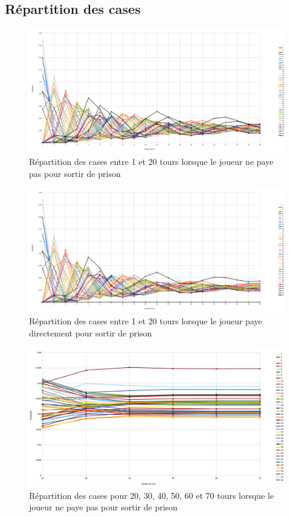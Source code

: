 \documentclass[letterpaper]{article}
\begin{document}
      \subsection{Répartition des cases}
	\begin{center}
	  \begin{figure}[bp!]
	    \includegraphics[scale=0.26]{./Images/GraphRepPayePasLeq20.png}
	    \caption{\label{graph_result_paye_pas} Répartition des cases entre 1 et 20 tours lorsque le joueur ne paye pas pour sortir de prison}
	  \end{figure}

	  \begin{figure}[bp!]
	    \includegraphics[scale=0.26]{./Images/GraphRepPayeLeq20.png}
	    \caption{\label{graph_result_paye} Répartition des cases entre 1 et 20 tours lorsque le joueur paye directement pour sortir de prison}
	  \end{figure}

	  \begin{figure}[bp!]
	    \includegraphics[scale=0.4]{./Images/GraphRepPayePas20-70.png}
	    \caption{\label{graph_all_result_paye_pas} Répartition des cases pour 20, 30, 40, 50, 60 et 70 tours lorsque le joueur ne paye pas pour sortir de prison}
	  \end{figure}


\end{center}
\end{document}
